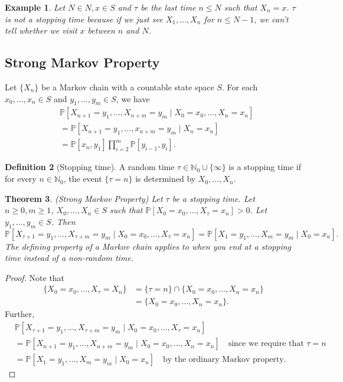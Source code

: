 \documentclass{tufte-handout}
\newcommand*\N{\mathbb{N}}
\renewcommand*\P{\mathbb{P}}
\newtheorem{thm}{Theorem}[subsection]
\newtheorem{ex}[thm]{Example}
\theoremstyle{definition}
\newtheorem{defn}[thm]{Definition}
\begin{document}
\begin{ex}
	Let $N \in N, x \in S$ and $\tau$ be the last time $n \le N$ such that $X_n = x$. $\tau$ is not a stopping time because if we just see $X_1,\ldots,X_n$ for $n \le N-1$, we can't tell whether we visit $x$ between $n$ and $N$.
\end{ex}

\subsection{Strong Markov Property}

Let $\{X_n\}$ be a Markov chain with a countable state space $S$. For each $x_0,\ldots,x_n \in S$ and $y_1,\ldots,y_m \in S$, we have 
\begin{align*}
	&\P\left[X_{n+1} = y_1,\ldots,X_{n+m} = y_m \mid X_0 = x_0,\ldots,X_n = x_n\right] \\
	&= \P\left[X_{n+1} = y_1, \ldots, x_{n+m} = y_m \mid X_n = x_n\right]  \\
	&= \P\left[x_n, y_1\right] \prod_{i=2}^{m} \P\left[y_{i-1}, y_i\right] 
.\end{align*}

\begin{defn}[Stopping time]
	A random time $\tau \in \N_0 \cup \{\infty\}$ is a stopping time if for every $n \in \N_0$, the event $\{\tau = n\}$ is determined by $X_0,\ldots,X_n$.
\end{defn}

\begin{thm}
	(Strong Markov Property) Let $\tau$ be a stopping time. Let $n \ge 0, m \ge 1$, $X_0,\ldots,X_n \in S$ such that $\P\left[X_0= x_0,\ldots,X_\tau = x_n\right] > 0$. Let $y_1,\ldots,y_m \in S$. Then \[
		\P\left[X_{\tau+1} = y_1,\ldots,X_{\tau+m} = y_m \mid X_0 = x_0, \ldots, X_\tau = x_n\right] = \P\left[X_1=y_1,\ldots,X_m = y_m \mid X_0=x_n\right] 
	.\] The defining property of a Markov chain applies to when you end at a stopping time instead of a non-random time.
\end{thm}

\begin{proof}
	Note that \begin{align*}
		\{X_0 = x_0,\ldots,X_\tau = X_n\} &= \{\tau = n\} \cap \{X_0 = x_0, \ldots, X_n = x_n\} \\
										  &= \{X_0 = x_0,\ldots,X_n = x_n\}
	.\end{align*}
	Further,
	\begin{align*}
		&\P\left[X_{\tau + 1} = y_1, \ldots, X_{\tau + m } = y_m \mid X_0 = x_0, \ldots, X_\tau = x_n\right] \\
		&= \P\left[X_{n+1} = y_1,\ldots,X_{n+m} = y_m \mid X_0 = x_0, \ldots, X_n = x_n\right]  \quad \text{since we require that } \tau = n \\
		&= \P\left[X_1 = y_1,\ldots,X_m = y_m \mid X_0 = x_n\right] \quad \text{by the ordinary Markov property}
	.\end{align*}
\end{proof}
\end{document}
